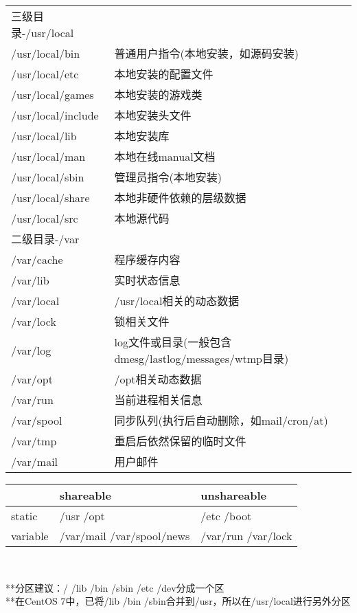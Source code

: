 \documentclass[UTF8, fontset=ubuntu]{ctexart}
\begin{document}
\begin{longtable}{l l}
三级目录-/usr/local \\
/usr/local/bin  &  普通用户指令(本地安装，如源码安装) \\
/usr/local/etc   & 本地安装的配置文件 \\
/usr/local/games  &  本地安装的游戏类 \\
/usr/local/include &   本地安装头文件 \\
/usr/local/lib    &本地安装库 \\
/usr/local/man   & 本地在线manual文档 \\
/usr/local/sbin   & 管理员指令(本地安装) \\
/usr/local/share   & 本地非硬件依赖的层级数据 \\
/usr/local/src   & 本地源代码 \vspace{2em} \\

二级目录-/var \\
/var/cache   & 程序缓存内容 \\
/var/lib   & 实时状态信息 \\
/var/local  &  /usr/local相关的动态数据 \\
/var/lock   & 锁相关文件 \\
/var/log   & log文件或目录(一般包含dmesg/lastlog/messages/wtmp目录) \\
/var/opt   & /opt相关动态数据 \\
/var/run   & 当前进程相关信息 \\
/var/spool  &  同步队列(执行后自动删除，如mail/cron/at) \\
/var/tmp   & 重启后依然保留的临时文件 \\
/var/mail   & 用户邮件 \\
\end{longtable}
\begin{flushleft}
\begin{tabular}{l|l|l}
\hline
 & shareable & unshareable \\
\hline
static & /usr /opt & /etc /boot \\
\hline
variable & /var/mail /var/spool/news & /var/run /var/lock \\
\hline
\end{tabular} \\
\end{flushleft}
**分区建议：/ /lib /bin /sbin /etc /dev分成一个区 \\
**在CentOS 7中，已将/lib /bin /sbin合并到/usr，所以在/usr/local进行另外分区 \\
\end{document}
